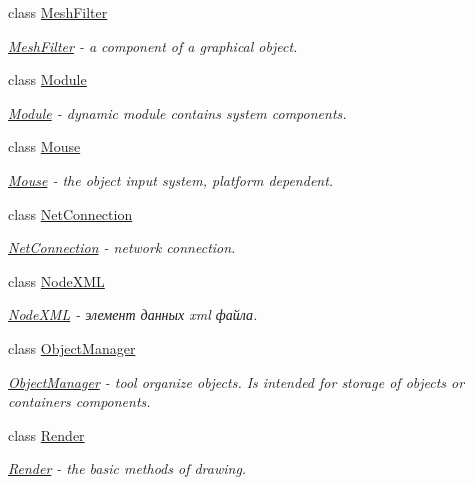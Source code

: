 \begin{DoxyCompactItemize}
class \hyperlink{classcsad_1_1_mesh_filter}{Mesh\-Filter}
\begin{DoxyCompactList}\small\item\em \hyperlink{classcsad_1_1_mesh_filter}{Mesh\-Filter} -\/ a component of a graphical object. \end{DoxyCompactList}\item 
class \hyperlink{classcsad_1_1_module}{Module}
\begin{DoxyCompactList}\small\item\em \hyperlink{classcsad_1_1_module}{Module} -\/ dynamic module contains system components. \end{DoxyCompactList}\item 
class \hyperlink{classcsad_1_1_mouse}{Mouse}
\begin{DoxyCompactList}\small\item\em \hyperlink{classcsad_1_1_mouse}{Mouse} -\/ the object input system, platform dependent. \end{DoxyCompactList}\item 
class \hyperlink{classcsad_1_1_net_connection}{Net\-Connection}
\begin{DoxyCompactList}\small\item\em \hyperlink{classcsad_1_1_net_connection}{Net\-Connection} -\/ network connection. \end{DoxyCompactList}\item 
class \hyperlink{classcsad_1_1_node_x_m_l}{Node\-X\-M\-L}
\begin{DoxyCompactList}\small\item\em \hyperlink{classcsad_1_1_node_x_m_l}{Node\-X\-M\-L} -\/ элемент данных xml файла. \end{DoxyCompactList}\item 
class \hyperlink{classcsad_1_1_object_manager}{Object\-Manager}
\begin{DoxyCompactList}\small\item\em \hyperlink{classcsad_1_1_object_manager}{Object\-Manager} -\/ tool organize objects. Is intended for storage of objects or containers components. \end{DoxyCompactList}\item 
class \hyperlink{classcsad_1_1_render}{Render}
\begin{DoxyCompactList}\small\item\em \hyperlink{classcsad_1_1_render}{Render} -\/ the basic methods of drawing. \end{DoxyCompactList}\item 

\end{DoxyCompactItemize}

